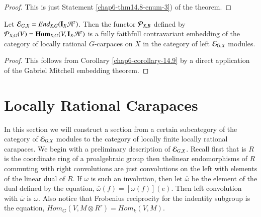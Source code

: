 \begin{proof}
This is just Statement \ref{chap6-thm14.8-enum-3}) of the theorem.
\end{proof}

\begin{seccoro}\label{chap6-corollary-14.10}
Let $\mathcal{E}_{G, X} = End_{X, G}(\mathbf{I}_{X} \mathcal{A}^{\tau})$. Then the functor $\mathcal{P}_{X, B}$ defined by $\mathcal{P}_{X, G}(V) = \operatorname{\mathbf{Hom}}_{X, G}(V, \mathbf{I}_{X} \mathcal{A}^{\tau})$ is a fully faithfull contravariant embedding of the category of locally rational $G$-carpaces on $X$ in the category of left $\mathcal{E}_{G, X}$ modules.
\end{seccoro}

\begin{proof}
This follows from Corollary \ref{chap6-corollary-14.9} by a direct application of the Gabriel Mitchell embedding theorem.
\end{proof}

\section{Locally Rational Carapaces}\label{chap6-sec-15}

In this section we will construct a section from a certain subcategory of the category of $\mathcal{E}_{G, X}$ modules to the category of locally finite locally rational carapaces. We begin with a preliminary description of $\mathcal{E}_{G, X}$. Recall first that is $R$ is the coordinate ring of a proalgebraic group then thelinear endomorphisms of $R$ commuting with right convolutions are just convolutions on the left with elements of the linear dual of $R$. If $\omega$ is such an involution, then let $\overline{\omega}$ be the element of the dual defined by the equation, $\overline{\omega}(f) = [\omega(f)](e)$. Then left convolution with $\overline{\omega}$ is $\omega$. Also notice that Frobenius reciprocity for the indentity subgroup is the equation, $Hom_{G}(V, M \otimes R^{\tau}) = Hom_{k}(V, M)$.

